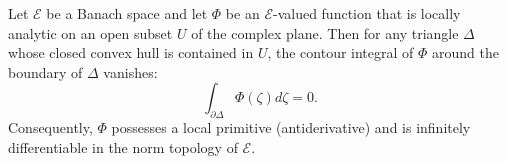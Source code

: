 Let $\mathcal{E}$ be a Banach space and let $\Phi$ be an $\mathcal{E}$-valued function that is locally analytic on an open subset $U$ of the complex plane. Then for any triangle $\Delta$ whose closed convex hull is contained in $U$, the contour integral of $\Phi$ around the boundary of $\Delta$ vanishes:
$$\int_{\partial \Delta} \Phi(\zeta) d\zeta = 0.$$
Consequently, $\Phi$ possesses a local primitive (antiderivative) and is infinitely differentiable in the norm topology of $\mathcal{E}$.

